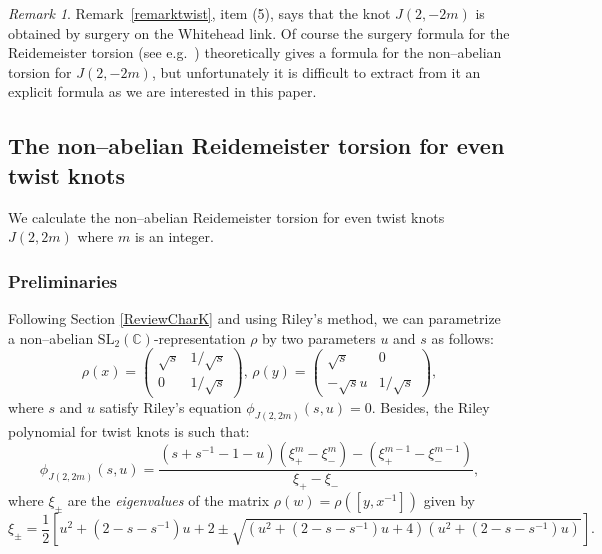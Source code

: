 \documentclass[a4paper]{amsart}
\theoremstyle{plain}
\theoremstyle{definition}
\theoremstyle{remark}
\newtheorem{remark}{Remark}%
\newcommand{\C}{{\mathbb C}}
\newcommand{\SL}{{\mathrm{SL}_2(\C)}}
\begin{document}
\begin{remark}
 Remark~\ref{remarktwist}, item (5), says that the knot $J(2, -2m)$ is obtained by surgery on the Whitehead link. Of course the surgery formula for the Reidemeister torsion (see e.g.~\cite[Theorem 4.1 (iii)]{Porti:1997}) theoretically gives a formula for the non--abelian torsion for $J(2, -2m)$, but unfortunately it is difficult to extract from it an explicit formula as we are interested in this paper.
\end{remark}

\subsection{The non--abelian Reidemeister torsion for  even twist knots}
We calculate the non--abelian Reidemeister torsion for  even twist knots $J(2, 2m)$ where $m$ is an integer.

\subsubsection{Preliminaries}
Following Section \ref{ReviewCharK} and using Riley's method, we can parametrize a non--abelian $\SL$-representation $\rho$ by two parameters $u$ and $s$  as follows:
\[
\rho(x) = 
\left(
\begin{array}{cc}
\sqrt{s} & 1/\sqrt{s} \\
0 & 1/\sqrt{s}
\end{array}
\right),\,
\rho(y) = 
\left(
\begin{array}{cc}
\sqrt{s} & 0 \\
-\sqrt{s} u & 1/\sqrt{s}
\end{array}
\right),
\]
where $s$ and $u$ satisfy Riley's equation $\phi_{J(2, 2m)}(s, u) = 0$. Besides, the Riley polynomial for twist knots is such that: 
\begin{equation}\label{eqn:Riley_poly}
\phi_{J(2, 2m)} (s,u)
=
\frac{(s+s^{-1}-1-u)(\xi_{+}^m - \xi_{-}^m) -(\xi_{+}^{m-1} - \xi_{-}^{m-1})}{\xi_{+} - \xi_{-}},
\end{equation}
where $\xi_{\pm}$ are the \emph{eigenvalues}  of the matrix $\rho(w) = \rho([y, x^{-1}])$ given by 
\begin{equation}\label{ev}
\xi_{\pm}   = \frac{1}{2} \left[ {u^2+(2-s-s^{-1})u+2 \pm \sqrt{(u^2+(2-s-s^{-1})u+4)(u^2+(2-s-s^{-1})u)}}\right].
\end{equation}

\end{document}
